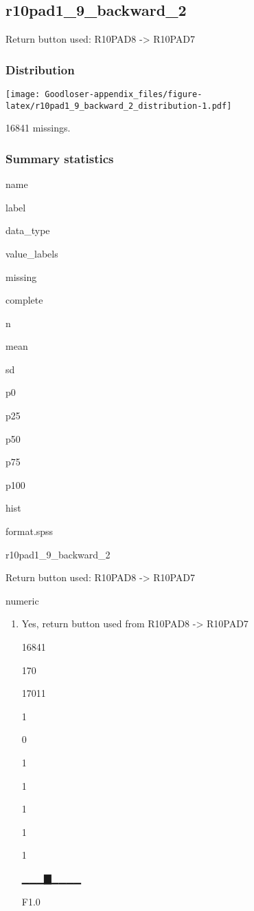 \documentclass[]{book}
\providecommand{\tightlist}{%
  \setlength{\itemsep}{0pt}\setlength{\parskip}{0pt}}
\begin{document}
\subsection{r10pad1\_9\_backward\_2}\label{r10pad1_9_backward_2}

Return button used: R10PAD8 -\textgreater{} R10PAD7

\subsubsection{Distribution}\label{r10pad1_9_backward_2_distribution}

\texttt{[image: Goodloser-appendix\_files/figure-latex/r10pad1\_9\_backward\_2\_distribution-1.pdf]}

16841 missings.

\subsubsection{Summary statistics}\label{r10pad1_9_backward_2_summary}

name

label

data\_type

value\_labels

missing

complete

n

mean

sd

p0

p25

p50

p75

p100

hist

format.spss

r10pad1\_9\_backward\_2

Return button used: R10PAD8 -\textgreater{} R10PAD7

numeric

\begin{enumerate}
\def\labelenumi{\arabic{enumi}.}
\tightlist
\item
  Yes, return button used from R10PAD8 -\textgreater{} R10PAD7

  16841

  170

  17011

  1

  0

  1

  1

  1

  1

  1

  ▁▁▁▇▁▁▁▁

  F1.0
\end{enumerate}
\end{document}
